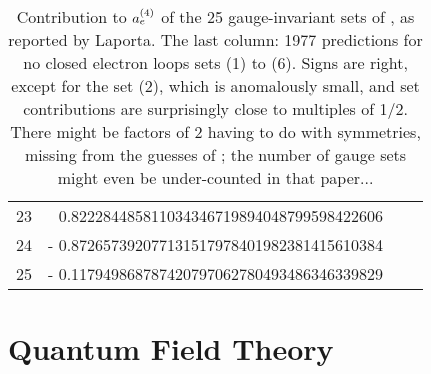 \begin{description}
\begin{table}
\begin{center}
\begin{tabular}{rrrr}
   23 & \phantom{+} 0.822284485811034346719894048799598422606  \\%
   24 & - 0.872657392077131517978401982381415610384  \\%
   25 & - 0.117949868787420797062780493486346339829  \\%
\hline
\end{tabular}
\end{center}
\caption{
Contribution to $a_e^{(4)}$ of the 25 gauge-invariant sets
of , as reported by Laporta.
The last column:
1977 predictions for no closed electron loops
sets (1) to (6).
Signs are right, except for the set (2), which is anomalously small,
and set contributions are surprisingly close to multiples of 1/2.
%
There might be factors of 2 having to do with symmetries, missing from the
guesses of ; the number of gauge sets might even be
under-counted in that paper...
}
\label{Laporta17:tableset}
\end{table}
\newpage


\end{description}





\section{Quantum Field Theory}
\label{sect:QFT}

